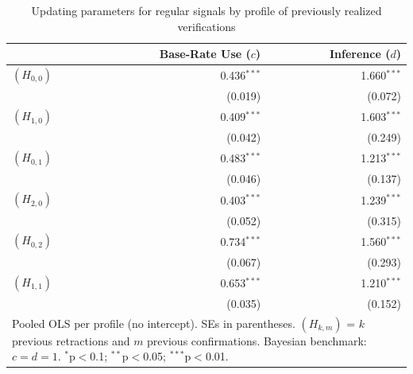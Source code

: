 \begin{table}[htbp]
\centering
\caption{Updating parameters for regular signals by profile of previously realized verifications}
\label{tab:cd_by_verification_profile}
\begin{tabular}{lrr}
\hline
 & Base-Rate Use ($c$) & Inference ($d$) \\
\hline
$(H_{0,0})$ & 0.436$^{***}$ & 1.660$^{***}$ \\
 & (0.019) & (0.072) \\
$(H_{1,0})$ & 0.409$^{***}$ & 1.603$^{***}$ \\
 & (0.042) & (0.249) \\
$(H_{0,1})$ & 0.483$^{***}$ & 1.213$^{***}$ \\
 & (0.046) & (0.137) \\
$(H_{2,0})$ & 0.403$^{***}$ & 1.239$^{***}$ \\
 & (0.052) & (0.315) \\
$(H_{0,2})$ & 0.734$^{***}$ & 1.560$^{***}$ \\
 & (0.067) & (0.293) \\
$(H_{1,1})$ & 0.653$^{***}$ & 1.210$^{***}$ \\
 & (0.035) & (0.152) \\
\hline
\multicolumn{3}{p{0.7\textwidth}}{\small Pooled OLS per profile (no intercept). SEs in parentheses. $(H_{k,m})$ = $k$ previous retractions and $m$ previous confirmations. Bayesian benchmark: $c=d=1$. $^{*}$p$<$0.1; $^{**}$p$<$0.05; $^{***}$p$<$0.01.} \\
\end{tabular}
\end{table}
